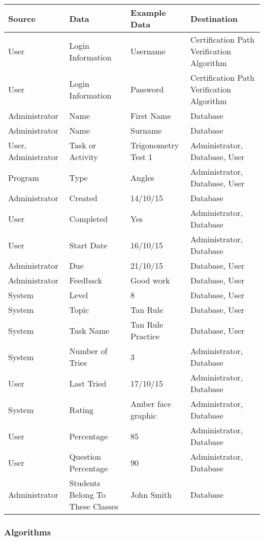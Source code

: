 \begin{center}
\begin{tabular}{|p{3cm}|p{3cm}|p{3cm}|p{3cm}|}
\hline
\textbf{Source} & \textbf{Data} & \textbf{Example Data} & \textbf{Destination} \\ \hline
User & Login Information & Username & Certification Path Verification Algorithm \\ \hline
User & Login Information & Password & Certification Path Verification Algorithm \\ \hline
Administrator & Name & First Name & Database \\ \hline
Administrator & Name & Surname & Database \\ \hline
User, Administrator & Task or Activity & Trigonometry Test 1 & Administrator, Database, User \\ \hline
Program & Type & Angles & Administrator, Database, User \\ \hline
Administrator & Created & 14/10/15 & Database \\ \hline
User & Completed & Yes & Administrator, Database \\ \hline
User & Start Date & 16/10/15 & Administrator, Database \\ \hline
Administrator & Due & 21/10/15 & Database, User \\ \hline
Administrator & Feedback & Good work & Database, User \\ \hline
System & Level & 8 & Database, User \\ \hline
System & Topic & Tan Rule & Database, User \\ \hline
System & Task Name & Tan Rule Practice & Database, User \\ \hline
System & Number of Tries & 3 &Administrator, Database \\ \hline
User & Last Tried & 17/10/15 & Administrator, Database \\ \hline
System & Rating & Amber face graphic & Administrator, Database \\ \hline
User & Percentage & 85 & Administrator, Database \\ \hline
User & Question Percentage & 90 & Administrator, Database \\ \hline
Administrator & Students Belong To These Classes & John Smith & Database \\ \hline
\end{tabular}
\end{center}

\subsubsection{Algorithms}

